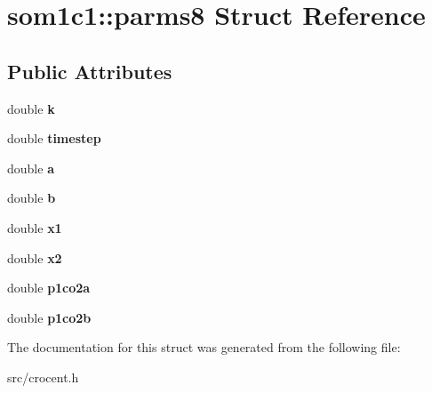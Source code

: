 \hypertarget{structsom1c1_1_1parms8}{\section{som1c1\-:\-:parms8 Struct Reference}
\label{structsom1c1_1_1parms8}
}
\subsection*{Public Attributes}
\begin{DoxyCompactItemize}
\item 
\hypertarget{structsom1c1_1_1parms8_ad7238c7322283ae6a056e8ea2b8982ea}{double {\bfseries k}}\label{structsom1c1_1_1parms8_ad7238c7322283ae6a056e8ea2b8982ea}

\item 
\hypertarget{structsom1c1_1_1parms8_aa532ffbb382f3058af59358711af4313}{double {\bfseries timestep}}\label{structsom1c1_1_1parms8_aa532ffbb382f3058af59358711af4313}

\item 
\hypertarget{structsom1c1_1_1parms8_a58d906e9e1157a2f02bebe9f90ed54b2}{double {\bfseries a}}\label{structsom1c1_1_1parms8_a58d906e9e1157a2f02bebe9f90ed54b2}

\item 
\hypertarget{structsom1c1_1_1parms8_a61e39378b8154faddab1eae5d2006dce}{double {\bfseries b}}\label{structsom1c1_1_1parms8_a61e39378b8154faddab1eae5d2006dce}

\item 
\hypertarget{structsom1c1_1_1parms8_a6e757c587a4d17fd8f03922a07672148}{double {\bfseries x1}}\label{structsom1c1_1_1parms8_a6e757c587a4d17fd8f03922a07672148}

\item 
\hypertarget{structsom1c1_1_1parms8_a488bf48b39580610615d1bf2eeb0a37c}{double {\bfseries x2}}\label{structsom1c1_1_1parms8_a488bf48b39580610615d1bf2eeb0a37c}

\item 
\hypertarget{structsom1c1_1_1parms8_abb44ecd20d2906a03c17f873b9a56e39}{double {\bfseries p1co2a}}\label{structsom1c1_1_1parms8_abb44ecd20d2906a03c17f873b9a56e39}

\item 
\hypertarget{structsom1c1_1_1parms8_af30099ff4c6c715b8b1d5cfc8b822502}{double {\bfseries p1co2b}}\label{structsom1c1_1_1parms8_af30099ff4c6c715b8b1d5cfc8b822502}

\end{DoxyCompactItemize}


The documentation for this struct was generated from the following file\-:\begin{DoxyCompactItemize}
\item 
src/crocent.\-h\end{DoxyCompactItemize}
